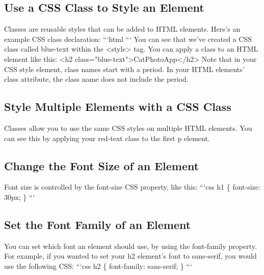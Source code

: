 \documentclass{article}%
\begin{document}
%
\subsection{Use a CSS Class to Style an Element}%
\label{subsec:UseaCSSClasstoStyleanElement}%
Classes are reusable styles that can be added to HTML elements.\newline%
Here's an example CSS class declaration:\newline%
```html\newline%
```\newline%
You can see that we've created a CSS class called blue{-}text within the <style> tag.\newline%
You can apply a class to an HTML element like this:\newline%
<h2 class="blue{-}text">CatPhotoApp</h2>\newline%
Note that in your CSS style element, class names start with a period. In your HTML elements' class attribute, the class name does not include the period.\newline%

%
\subsection{Style Multiple Elements with a CSS Class}%
\label{subsec:StyleMultipleElementswithaCSSClass}%
Classes allow you to use the same CSS styles on multiple HTML elements. You can see this by applying your red{-}text class to the first p element.\newline%

%
\subsection{Change the Font Size of an Element}%
\label{subsec:ChangetheFontSizeofanElement}%
Font size is controlled by the font{-}size CSS property, like this:\newline%
```css\newline%
h1 \{\newline%
  font{-}size: 30px;\newline%
\}\newline%
```\newline%

%
\subsection{Set the Font Family of an Element}%
\label{subsec:SettheFontFamilyofanElement}%
You can set which font an element should use, by using the font{-}family property.\newline%
For example, if you wanted to set your h2 element's font to sans{-}serif, you would use the following CSS:\newline%
```css\newline%
h2 \{\newline%
  font{-}family: sans{-}serif;\newline%
\}\newline%
```\newline%
\end{document}
